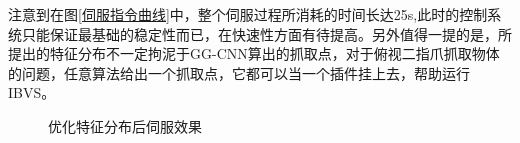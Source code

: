 \documentclass[fontset=fandol,type=bachelor,campus=harbin]{hithesisbook}
\begin{document}
注意到在图\ref{伺服指令曲线}中，整个伺服过程所消耗的时间长达25s,此时的控制系统只能保证最基础的稳定性而已，在快速性方面有待提高。另外值得一提的是，所提出的特征分布不一定拘泥于GG-CNN算出的抓取点，对于俯视二指爪抓取物体的问题，任意算法给出一个抓取点，它都可以当一个插件挂上去，帮助运行IBVS。
\begin{figure}[h]
	\centering
	\caption{优化特征分布后伺服效果}
	\label{优化自定义效果}
\end{figure}
\end{document}
